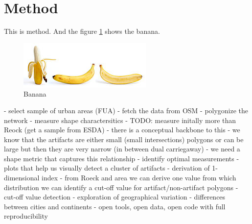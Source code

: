 \section{Method}
\label{sec:method}

This is method. And the figure \ref{fig:banana} shows the banana.

\begin{figure}
    \includegraphics[width=\textwidth]{figures/banana.jpg}
    \caption{Banana}
    \label{fig:banana}
\end{figure}


- select sample of urban areas (FUA)
- fetch the data from OSM
- polygonize the network
- measure shape charactersitics
    - TODO: measure initally more than Reock (get a sample from ESDA)
    - there is a conceptual backbone to this - we know that the artifacts are either
    small (small intersections) polygons or can be large but then they are very narrow
    (in between dual carriegaway)
    - we need a shape metric that captures this relationship
- identify optimal measurements
    - plots that help us visually detect a cluster of artifacts
- derivation of 1-dimensional index
    - from Roeck and area we can derive one value from which distribution we can
    identify a cut-off value for artifact/non-artifact polygons
- cut-off value detection
- exploration of geographical variation
    - differences between cities and continents
- open tools, open data, open code with full reproducibility